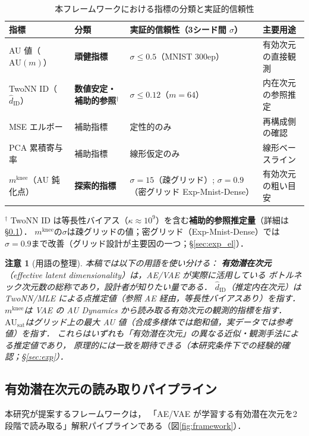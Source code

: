 \documentclass[11pt,a4paper]{jsarticle}
\newtheorem{remark}{注意}
\newcommand{\kap}{\kappa}
\newcommand{\AUsat}{\mathrm{AU}_{\mathrm{sat}}}
\newcommand{\mknee}{m^{\mathrm{knee}}}
\begin{document}
\begin{table}[H]
\centering
\caption{本フレームワークにおける指標の分類と実証的信頼性}
\label{tab:indicator_class}
\small
\begin{tabular}{llll}
\toprule
指標 & 分類 & 実証的信頼性（3シード間 $\sigma$） & 主要用途 \\
\midrule
AU 値（$\mathrm{AU}(m)$） & \textbf{頑健指標} & $\sigma \leq 0.5$（MNIST 300ep） & 有効次元の直接観測 \\
TwoNN ID（$\hat{d}_\mathrm{ID}$） & \textbf{数値安定・補助的参照}$^\dagger$ & $\sigma \leq 0.12$（$m=64$） & 内在次元の参照推定 \\
MSE エルボー & 補助指標 & 定性的のみ & 再構成側の確認 \\
PCA 累積寄与率 & 補助指標 & 線形仮定のみ & 線形ベースライン \\
$\mknee$（AU 鈍化点） & \textbf{探索的指標} & $\sigma = 15$（疎グリッド）; $\sigma = 0.9$（密グリッド Exp-Mnist-Dense） & 有効次元の粗い目安 \\
\bottomrule
\end{tabular}
\medskip
\footnotesize
$^\dagger$ TwoNN ID は等長性バイアス（$\kap \approx 10^9$）を含む\textbf{補助的参照推定量}（詳細は§\ref{sec:framework_pipeline}）．
$\mknee$の$\sigma$は疎グリッドの値；密グリッド（Exp-Mnist-Dense）では$\sigma=0.9$まで改善（グリッド設計が主要因の一つ；§\ref{sec:exp_el}）．
\normalsize
\end{table}

\begin{remark}[用語の整理]
本稿では以下の用語を使い分ける：
\textbf{有効潜在次元}（effective latent dimensionality）は，AE/VAE が実際に活用している
ボトルネック次元数の総称であり，設計者が知りたい量である．
\textbf{$\hat{d}_\mathrm{ID}$}（推定内在次元）は TwoNN/MLE による点推定値（参照 AE 経由，等長性バイアスあり）を指す．
\textbf{$\mknee$}は VAE の AU Dynamics から読み取る有効次元の観測的指標を指す．
\textbf{$\AUsat$}はグリッド上の最大 AU 値（合成多様体では飽和値，実データでは参考値）を指す．
これらはいずれも「有効潜在次元」の異なる近似・観測手法による推定値であり，
原理的には一致を期待できる（本研究条件下での経験的確認；§\ref{sec:exp}）．
\end{remark}

\subsection{有効潜在次元の読み取りパイプライン}\label{sec:framework_pipeline}

本研究が提案するフレームワークは，
「AE/VAE が学習する有効潜在次元を2段階で読み取る」解釈パイプラインである（図\ref{fig:framework}）．
\end{document}
